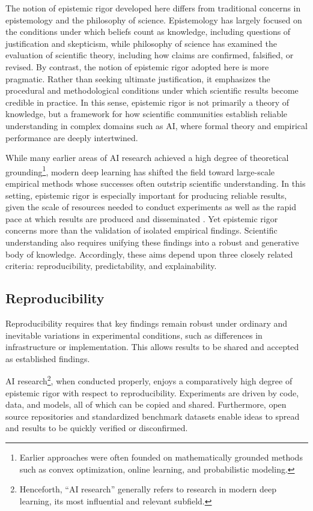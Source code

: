 \documentclass{article}
\begin{document}
The notion of epistemic rigor developed here differs from traditional concerns in epistemology and the philosophy of science.
Epistemology has largely focused on the conditions under which beliefs count as knowledge, including questions of justification and skepticism, while philosophy of science has examined the evaluation of scientific theory, including how claims are confirmed, falsified, or revised.
By contrast, the notion of epistemic rigor adopted here is more pragmatic.
Rather than seeking ultimate justification, it emphasizes the procedural and methodological conditions under which scientific results become credible in practice.
In this sense, epistemic rigor is not primarily a theory of knowledge, but a framework for how scientific communities establish reliable understanding in complex domains such as AI, where formal theory and empirical performance are deeply intertwined.

While many earlier areas of AI research achieved a high degree of theoretical grounding\footnote{Earlier approaches were often founded on mathematically grounded methods such as convex optimization, online learning, and probabilistic modeling.}, modern deep learning has shifted the field toward large-scale empirical methods whose successes often outstrip scientific understanding.
In this setting, epistemic rigor is especially important for producing reliable results, given the scale of resources needed to conduct experiments \cite{Cottier2023DollarTrainingCostML, YouOwen2025PowerDemandsFrontierAI} as well as the rapid pace at which results are produced and disseminated \cite{Maslej2023AIIndexReport}.
Yet epistemic rigor concerns more than the validation of isolated empirical findings.
Scientific understanding also requires unifying these findings into a robust and generative body of knowledge.
Accordingly, these aims depend upon three closely related criteria: reproducibility, predictability, and explainability.


\subsection{Reproducibility}

Reproducibility requires that key findings remain robust under ordinary and inevitable variations in experimental conditions, such as differences in infrastructure or implementation.
This allows results to be shared and accepted as established findings.

AI research\footnote{Henceforth, ``AI research'' generally refers to research in modern deep learning, its most influential and relevant subfield.}, when conducted properly, enjoys a comparatively high degree of epistemic rigor with respect to reproducibility.
Experiments are driven by code, data, and models, all of which can be copied and shared.
Furthermore, open source repositories and standardized benchmark datasets enable ideas to spread and results to be quickly verified or disconfirmed.
\end{document}
